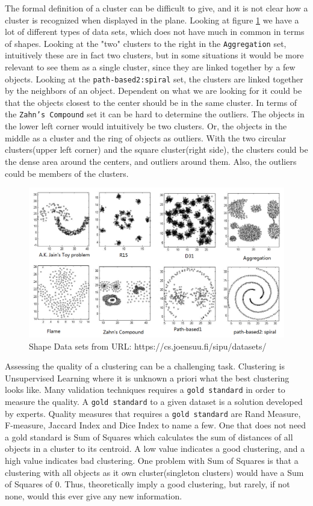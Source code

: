 \documentclass[a4paper,10pt]{article}
\theoremstyle{plain}
\theoremstyle{definition}
\begin{document}
The formal definition of a cluster can be difficult to give, and it is not clear how a cluster is recognized when displayed in the plane. Looking at figure \ref{shapeDataSets} we have a lot of different types of data sets, which does not have much in common in terms of shapes. Looking at the "two" clusters to the right in the \texttt{Aggregation} set, intuitively these are in fact two clusters, but in some situations it would be more relevant to see them as a single cluster, since they are linked together by a few objects. Looking at the \texttt{path-based2:spiral} set, the clusters are linked together by the neighbors of an object. Dependent on what we are looking for it could be that the objects closest to the center should be in the same cluster. In terms of the \texttt{Zahn's Compound} set it can be hard to determine the outliers. The objects in the lower left corner would intuitively be two clusters. Or, the objects in the middle as a cluster and the ring of objects as outliers. With the two circular clusters(upper left corner) and the square cluster(right side), the clusters could be the dense area around the centers, and outliers around them. Also, the outliers could be members of the clusters. 
\begin{figure}[H]
	\centering
	\includegraphics[scale=0.4]{./pictures/shapeDataSet/shapeDataSet.png}
	\caption{Shape Data sets from URL: https://cs.joensuu.fi/sipu/datasets/}
	\label{shapeDataSets}
\end{figure}

Assessing the quality of a clustering can be a challenging task. Clustering is Unsupervised Learning where it is unknown a priori what the best clustering looks like. Many validation techniques requires a \texttt{gold standard} in order to measure the quality. A \texttt{gold standard} to a given dataset is a solution developed by experts. Quality measures that requires a \texttt{gold standard} are Rand Measure, F-measure, Jaccard Index and Dice Index to name a few. One that does not need a gold standard is Sum of Squares which calculates the sum of distances of all objects in a cluster to its centroid. A low value indicates a good clustering, and a high value indicates bad clustering. One problem with Sum of Squares is that a clustering with all objects as it own cluster(singleton clusters) would have a Sum of Squares of 0. Thus, theoretically imply a good clustering, but rarely, if not none, would this ever give any new information.
\end{document}
